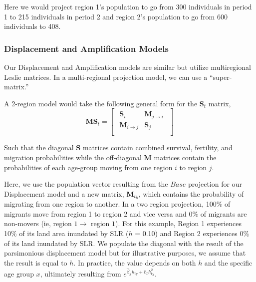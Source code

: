 \documentclass[12pt]{article}
\begin{document}
Here we would project region 1's population to go from 300 individuals
in period 1 to 215 individuals in period 2 and region 2's population to
go from 600 individuals to 408.

\hypertarget{displacement-and-amplification-models}{%
\subsubsection{Displacement and Amplification
Models}\label{displacement-and-amplification-models}}

Our Displacement and Amplification models are similar but utilize
multiregional Leslie matrices. In a multi-regional projection model, we
can use a ``super-matrix.''

A 2-region model would take the following general form for the
\(\mathbf{S}_t\) matrix, \begin{equation}
 \mathbf{MS}_t =
\begin{bmatrix}
\begin{array}{c|c}

\mathbf{S}_i & \mathbf{M}_{j\rightarrow i} \\
\hline
\mathbf{M}_{i\rightarrow j} & \mathbf{S}_j \\


\end{array}
\end{bmatrix}
\nonumber
\end{equation}

Such that the diagonal \(\mathbf{S}\) matrices contain combined
survival, fertility, and migration probabilities while the off-diagonal
\(\mathbf{M}\) matrices contain the probabilities of each age-group
moving from one region \(i\) to region \(j\).

Here, we use the population vector resulting from the \(Base\)
projection for our Displacement model and a new matrix,
\(\mathbf{M}_{ty}\), which contains the probability of migrating from
one region to another. In a two region projection, 100\% of migrants
move from region 1 to region 2 and vice versa and 0\% of migrants are
non-movers (ie, region \(1\rightarrow\) region \(1\)). For this example,
Region 1 experiences 10\% of its land area inundated by SLR (\(h\) =
0.10) and Region 2 experiences 0\% of its land inundated by SLR. We
populate the diagonal with the result of the parsimonious displacement
model but for illustrative purposes, we assume that the result is equal
to \(h\). In practice, the value depends on both \(h\) and the specific
age group \(x\), ultimately resulting from
\(e^{\hat\beta_xh_{ty}+\hat c_xh^2_{ty}}\).
\end{document}
